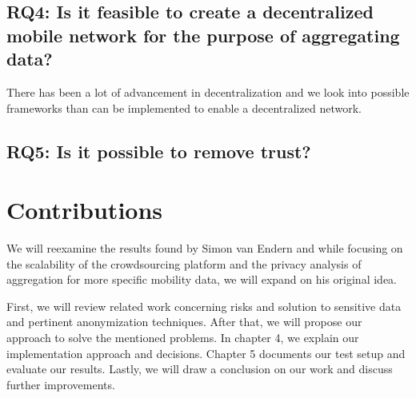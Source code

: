 \subsection*{RQ4: Is it feasible to create a decentralized mobile network for the purpose of aggregating data?}
There has been a lot of advancement in decentralization and we look into possible frameworks than can be implemented to enable a decentralized network.
\subsection{RQ5: Is it possible to remove trust?}

\section{Contributions}

We will reexamine the results found by Simon van Endern and while focusing on the scalability of the crowdsourcing platform and the privacy analysis of aggregation for more speciﬁc mobility data, we will expand on his original idea.

First, we will review related work concerning risks and solution to sensitive data and pertinent anonymization techniques. After that, we will propose our approach to solve the mentioned problems. In chapter 4, we explain our implementation approach and decisions. Chapter 5 documents our test setup and evaluate our results. Lastly, we will draw a conclusion on our work and discuss further improvements.
